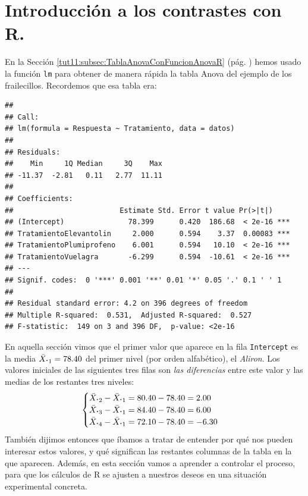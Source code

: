 \documentclass[10pt,a4paper]{article}\usepackage[]{graphicx}\usepackage[]{color}
\makeatletter
\newenvironment{kframe}{%
 \def\at@end@of@kframe{}%
 \ifinner\ifhmode%
  \def\at@end@of@kframe{\end{minipage}}%
  \begin{minipage}{\columnwidth}%
 \fi\fi%
 \def\FrameCommand##1{\hskip\@totalleftmargin \hskip-\fboxsep
 \colorbox{shadecolor}{##1}\hskip-\fboxsep
     \hskip-\linewidth \hskip-\@totalleftmargin \hskip\columnwidth}%
 \MakeFramed {\advance\hsize-\width
   \@totalleftmargin\z@ \linewidth\hsize
   \@setminipage}}%
 {\par\unskip\endMakeFramed%
 \at@end@of@kframe}
\newenvironment{knitrout}{}{} %
\newcounter {cont01}
\makeatother
\begin{document}
\section{Introducción a los contrastes con R.}
\label{tut11:sec:IntroduccionALosContrastes}


En la Sección \ref{tut11:subsec:TablaAnovaConFuncionAnovaR} (pág. \pageref{tut11:subsec:TablaAnovaConFuncionAnovaR}) hemos usado la función {\tt lm} para obtener de manera rápida la tabla Anova del ejemplo de los frailecillos. Recordemos que esa tabla era:


\begin{knitrout}
\color{fgcolor}\begin{kframe}
\begin{verbatim}
## 
## Call:
## lm(formula = Respuesta ~ Tratamiento, data = datos)
## 
## Residuals:
##    Min     1Q Median     3Q    Max 
## -11.37  -2.81   0.11   2.77  11.11 
## 
## Coefficients:
##                         Estimate Std. Error t value Pr(>|t|)    
## (Intercept)               78.399      0.420  186.68  < 2e-16 ***
## TratamientoElevantolin     2.000      0.594    3.37  0.00083 ***
## TratamientoPlumiprofeno    6.001      0.594   10.10  < 2e-16 ***
## TratamientoVuelagra       -6.299      0.594  -10.61  < 2e-16 ***
## ---
## Signif. codes:  0 '***' 0.001 '**' 0.01 '*' 0.05 '.' 0.1 ' ' 1
## 
## Residual standard error: 4.2 on 396 degrees of freedom
## Multiple R-squared:  0.531,	Adjusted R-squared:  0.527 
## F-statistic:  149 on 3 and 396 DF,  p-value: <2e-16
\end{verbatim}
\end{kframe}
\end{knitrout}

En aquella sección vimos que el primer valor que aparece en la fila {\tt Intercept} es la media $\bar X_{{\mbox{\bf\large$\cdot$}}1}=78.40$ del primer nivel (por orden alfabético), el {\em Aliron}. Los valores iniciales de las siguientes tres filas son {\em las diferencias} entre este valor y las medias de los restantes tres niveles:
\[
\begin{cases}
\bar X_{{\mbox{\bf\large$\cdot$}}2} - \bar X_{{\mbox{\bf\large$\cdot$}}1} =  80.40 - 78.40 = 2.00\\
\bar X_{{\mbox{\bf\large$\cdot$}}3} - \bar X_{{\mbox{\bf\large$\cdot$}}1} =  84.40 - 78.40 = 6.00\\
\bar X_{{\mbox{\bf\large$\cdot$}}4} - \bar X_{{\mbox{\bf\large$\cdot$}}1} =  72.10 - 78.40 = -6.30\\
\end{cases}
\]
También dijimos entonces que íbamos a tratar de entender por qué nos pueden interesar estos valores, y qué significan las restantes columnas de la tabla en la que aparecen. Además,  en esta sección vamos a aprender a controlar el proceso, para que los cálculos de R se ajusten a nuestros deseos en una situación experimental concreta.
\end{document}
